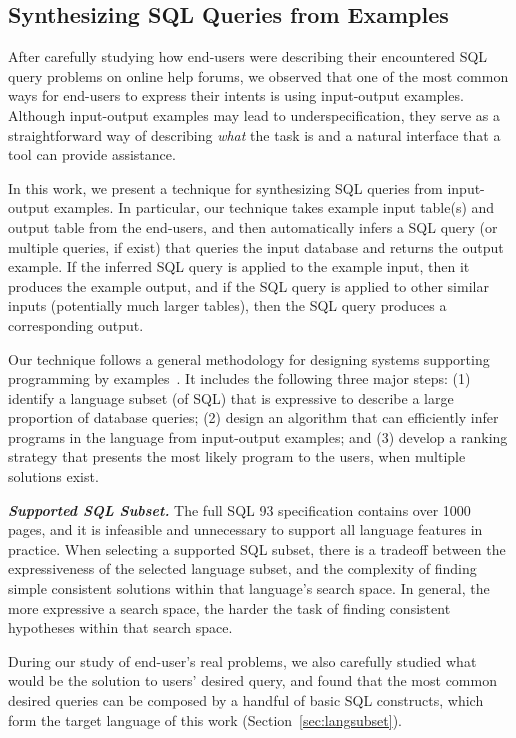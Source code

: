 \subsection{Synthesizing SQL Queries from Examples}

After carefully studying how end-users were describing their
encountered SQL query problems on online help forums, we observed that
one of the most common ways for end-users to
express their intents is using input-output examples. Although
input-output examples may lead to underspecification, they
serve as a straightforward way of describing \textit{what} the
task is and a natural interface that a tool can provide assistance.


In this work, we present a technique for synthesizing SQL queries
from input-output examples. In particular, our technique takes example input
table(s) and output table from the end-users, and then automatically
infers a SQL query (or multiple queries, if exist) that queries
the input database and returns the output example. If the inferred
SQL query is applied
to the example input, then it produces the example output, and if the
SQL query is applied to other similar inputs (potentially much larger tables),
then the SQL query produces a corresponding output.

Our technique follows a general methodology for designing
systems supporting programming by examples~\cite{Harris:2011}.
It includes the following three major steps:
(1) identify a language subset (of SQL) that is expressive to
describe a large proportion of %
database queries; (2) design an algorithm that
can efficiently infer programs in the language from input-output
examples; and (3) develop a ranking strategy that presents
the most likely program to the users, when multiple solutions exist.

\vspace{1mm}
\noindent \textbf{\textit{Supported SQL Subset.}}
The full SQL 93 specification contains over 1000 pages, and it is
infeasible and unnecessary to support all language features in practice.
When selecting a supported SQL subset, there is a tradeoff
between the expressiveness of the selected language subset,
and the complexity of finding simple consistent solutions
within that language's search space.  In general, the more expressive a search
space, the harder the task of finding consistent hypotheses within
that search space. 

During our study of end-user's real problems, we also carefully studied what would
be the solution to users' desired query, and found that the most common
desired queries can be composed by a handful of basic SQL constructs,
which form the target language of this work (Section~\ref{sec:langsubset}).

